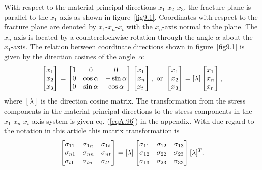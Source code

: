 \documentclass{AeroStructure-ERJohnson}
\begin{document}
With respect to the material principal directions $x_1$-$x_2$-$x_3$, the fracture plane is parallel to the $x_1$-axis as shown in figure~\ref{fig9.1}. Coordinates with respect to the fracture plane are denoted by $x_1$-$x_{n}$-$x_{t}$ with the $x_n$-axis normal to the plane. The $x_n$-axis is located by a counterclockwise rotation through the angle $\alpha$ about the $x_1$-axis. The relation between coordinate directions shown in figure~\ref{fig9.1} is given by the direction cosines of the angle~$\alpha$:
\begin{align}\label{eq9.1}
\left[\begin{array}{@{}l@{}}x_{1} \\x_{2} \\x_{3}\end{array}\right]=\left[\begin{array}{@{}ccc@{}}1 & 0 & 0 \\0 & \cos \alpha & -\sin \alpha \\0 & \sin \alpha & \cos \alpha\end{array}\right] \left[\begin{array}{@{}l@{}}x_{1} \\x_{n} \\x_{t}\end{array}\right], \textrm{ or } \left[\begin{array}{@{}l@{}}x_{1} \\x_{2} \\x_{3}\end{array}\right]=[\lambda]\left[\begin{array}{@{}l@{}}x_{1} \\x_{n} \\x_{t}\end{array}\right],
\end{align}
where $[\lambda]$ is the direction cosine matrix. The transformation from the stress components in the material principal directions to the stress components in the $x_1$-$x_{{n}}$-$x_{{t}}$ axis system is given eq. (\ref{eqA.96}) in the appendix. With due regard to the notation in this article this matrix transformation is
\begin{align}\label{eq9.2}
\left[\begin{array}{@{}lll@{}}\sigma_{11} & \sigma_{1 n} & \sigma_{1 t} \\\sigma_{n 1} & \sigma_{n n} & \sigma_{n t} \\\sigma_{t 1} & \sigma_{t n} & \sigma_{t t}\end{array}\right]=[\lambda]\left[\begin{array}{@{}lll@{}}\sigma_{11} & \sigma_{12} & \sigma_{13} \\\sigma_{12} & \sigma_{22} & \sigma_{23} \\\sigma_{13} & \sigma_{23} & \sigma_{33}\end{array}\right][\lambda]^{T}.
\end{align}
\vspace*{3pt}
\pagebreak
\end{document}

